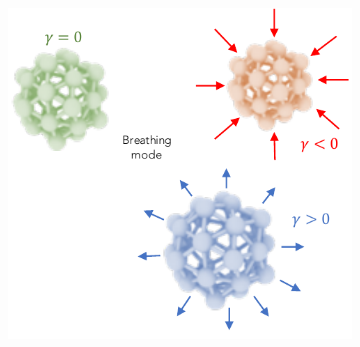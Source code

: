 \begin{figure}
\centering
\begin{subfigure}[b]{0.6\textwidth}
    \includegraphics[width=\textwidth]{figures/LM/GDM/Strut_breathingmode.pdf}
    \caption{} 
    \label{Fig:Breathe_Modes}
\end{subfigure}
\begin{subfigure}[b]{0.35\textwidth}

\end{subfigure}
\end{figure}
